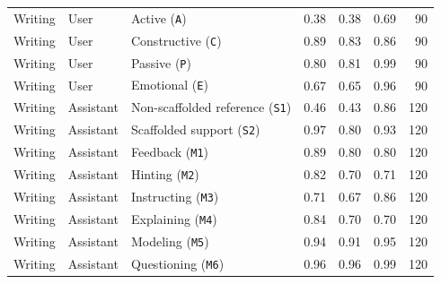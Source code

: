 \begin{table}[t]
{\begin{tabular}{lllrrrr}
\midrule
Writing & User & Active (\texttt{A}) & 0.38 & 0.38 & 0.69 & 90 \\
Writing & User & Constructive (\texttt{C}) & 0.89 & 0.83 & 0.86 & 90 \\
Writing & User & Passive (\texttt{P}) & 0.80 & 0.81 & 0.99 & 90 \\
Writing & User & Emotional (\texttt{E}) & 0.67 & 0.65 & 0.96 & 90 \\
Writing & Assistant & Non-scaffolded reference (\texttt{S1}) & 0.46 & 0.43 & 0.86 & 120 \\
Writing & Assistant & Scaffolded support (\texttt{S2}) & 0.97 & 0.80 & 0.93 & 120 \\
Writing & Assistant & Feedback (\texttt{M1}) & 0.89 & 0.80 & 0.80 & 120 \\
Writing & Assistant & Hinting (\texttt{M2}) & 0.82 & 0.70 & 0.71 & 120 \\
Writing & Assistant & Instructing (\texttt{M3}) & 0.71 & 0.67 & 0.86 & 120 \\
Writing & Assistant & Explaining (\texttt{M4}) & 0.84 & 0.70 & 0.70 & 120 \\
Writing & Assistant & Modeling (\texttt{M5}) & 0.94 & 0.91 & 0.95 & 120 \\
Writing & Assistant & Questioning (\texttt{M6}) & 0.96 & 0.96 & 0.99 & 120 \\
\bottomrule
\end{tabular}%
}
\end{table}
